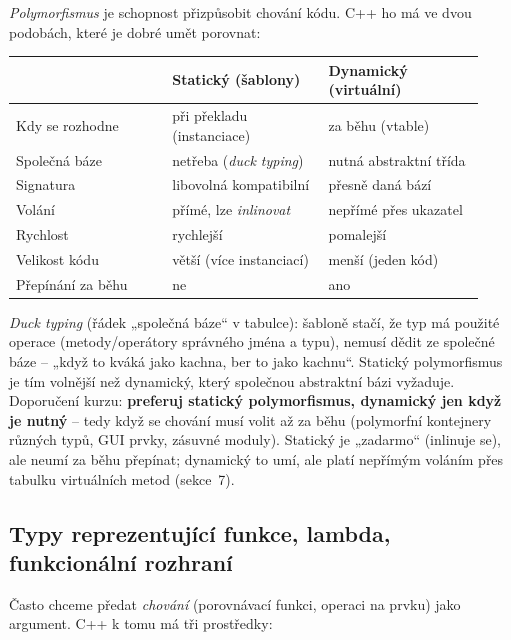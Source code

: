 \documentclass[11pt,a4paper]{article}
\begin{document}
\emph{Polymorfismus} je schopnost přizpůsobit chování kódu. C++ ho má ve dvou podobách, které je dobré umět porovnat:

\begin{center}
\renewcommand{\arraystretch}{1.25}
\begin{tabular}{@{}p{0.31\linewidth}p{0.31\linewidth}p{0.31\linewidth}@{}}
\toprule
 & \textbf{Statický (šablony)} & \textbf{Dynamický (virtuální)} \\
\midrule
Kdy se rozhodne & při překladu (instanciace) & za běhu (vtable) \\
Společná báze & netřeba (\emph{duck typing}) & nutná abstraktní třída \\
Signatura & libovolná kompatibilní & přesně daná bází \\
Volání & přímé, lze \emph{inlinovat} & nepřímé přes ukazatel \\
Rychlost & rychlejší & pomalejší \\
Velikost kódu & větší (více instanciací) & menší (jeden kód) \\
Přepínání za běhu & ne & ano \\
\bottomrule
\end{tabular}
\end{center}

\begin{intuice}
\emph{Duck typing} (řádek „společná báze`` v tabulce): šabloně stačí, že typ má použité operace (metody/operátory správného jména a typu), nemusí dědit ze společné báze -- „když to kváká jako kachna, ber to jako kachnu``. Statický polymorfismus je tím volnější než dynamický, který společnou abstraktní bázi vyžaduje. Doporučení kurzu: \textbf{preferuj statický polymorfismus, dynamický jen když je nutný} -- tedy když se chování musí volit až za běhu (polymorfní kontejnery různých typů, GUI prvky, zásuvné moduly). Statický je „zadarmo`` (inlinuje se), ale neumí za běhu přepínat; dynamický to umí, ale platí nepřímým voláním přes tabulku virtuálních metod (sekce~7).
\end{intuice}

\subsection{Typy reprezentující funkce, lambda, funkcionální rozhraní}

Často chceme předat \emph{chování} (porovnávací funkci, operaci na prvku) jako argument. C++ k tomu má tři prostředky:
\end{document}
